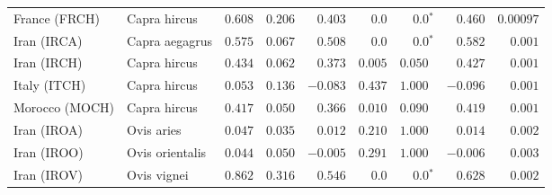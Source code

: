 \begin{center}
\begin{adjustbox}{width = 1\textwidth}
\begin{tabular}{|l|l|r|r|r|r|r|r|r|}
                  France (FRCH) &         Capra hircus &                                        $ 0.608$ &                                           $ 0.206$ &                      $ 0.403$ &            $0.0$ &                  $\bm{0.0{^*}}$ &                                           $ 0.460$ &          $0.00097$ \\
                    Iran (IRCA) &       Capra aegagrus &                                        $ 0.575$ &                                           $ 0.067$ &                      $ 0.508$ &            $0.0$ &                  $\bm{0.0{^*}}$ &                                           $ 0.582$ &           $ 0.001$ \\
                    Iran (IRCH) &         Capra hircus &                                        $ 0.434$ &                                           $ 0.062$ &                      $ 0.373$ &         $ 0.005$ &                      $ 0.050~~$ &                                           $ 0.427$ &           $ 0.001$ \\
                   Italy (ITCH) &         Capra hircus &                                        $ 0.053$ &                                           $ 0.136$ &                      $-0.083$ &         $ 0.437$ &                      $ 1.000~~$ &                                           $-0.096$ &           $ 0.001$ \\
                 Morocco (MOCH) &         Capra hircus &                                        $ 0.417$ &                                           $ 0.050$ &                      $ 0.366$ &         $ 0.010$ &                      $ 0.090~~$ &                                           $ 0.419$ &           $ 0.001$ \\
                    Iran (IROA) &           Ovis aries &                                        $ 0.047$ &                                           $ 0.035$ &                      $ 0.012$ &         $ 0.210$ &                      $ 1.000~~$ &                                           $ 0.014$ &           $ 0.002$ \\
                    Iran (IROO) &      Ovis orientalis &                                        $ 0.044$ &                                           $ 0.050$ &                      $-0.005$ &         $ 0.291$ &                      $ 1.000~~$ &                                           $-0.006$ &           $ 0.003$ \\
                    Iran (IROV) &          Ovis vignei &                                        $ 0.862$ &                                           $ 0.316$ &                      $ 0.546$ &            $0.0$ &                  $\bm{0.0{^*}}$ &                                           $ 0.628$ &           $ 0.002$ \\

\end{tabular}
\end{adjustbox}
\end{center}
